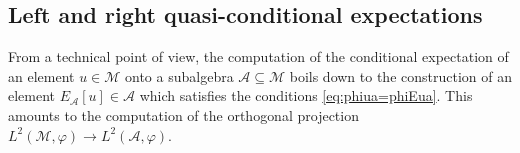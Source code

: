 \documentclass[12pt]{amsart}
\def\E{E}
\newcommand{\alg}[1]{\mathcal{#1}}
\theoremstyle{definition}
\numberwithin{equation}{section}
\begin{document}



% 
% 




\subsection{Left and right quasi-conditional expectations}
From a technical point of view,
the computation of the conditional expectation
of an element $u\in\alg{M}$
onto a subalgebra $\alg{A}\subseteq\alg{M}$
boils down to the construction
of an element $E_{\alg{A}}[u]\in \alg{A}$ which satisfies
the conditions \eqref{eq:phiua=phiEua}.
This amounts to the computation of the orthogonal projection
$L^2(\alg{M},\varphi)\to L^2(\alg{A},\varphi)$.
\end{document}
